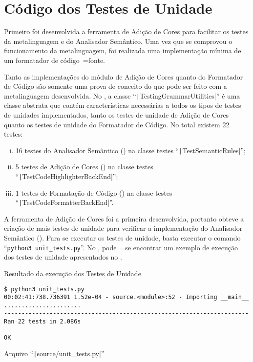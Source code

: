 \chapter[Testes de Unidade]{Código dos Testes de Unidade}

Primeiro foi desenvolvida a ferramenta de Adição de Cores para facilitar os testes da metalinguagem e
do Analisador Semântico.
Uma vez que se comprovou o funcionamento da metalinguagem,
foi realizada uma implementação mínima de um formatador de código~=fonte.

Tanto as implementações do módulo de Adição de Cores quanto do Formatador de Código são somente uma prova de conceito do que pode ser feito com a metalinguagem desenvolvida.
No ,
a classe ``\texttt|TestingGrammarUtilities|'' é uma classe abstrata \cite{understandingDataAbstraction} que contém características necessárias a todos os tipos de testes de unidades implementados,
tanto os testes de unidade de Adição de Cores quanto os testes de unidade do Formatador de Código.
No total existem 22 testes:
\begin{enumerate}[i)]
\item 16 testes do Analisador Semântico () na classe testes ``\texttt|TestSemanticRules|'';
\item 5 testes de Adição de Cores () na classe testes ``\texttt|TestCodeHighlighterBackEnd|'';
\item 1 testes de Formatação de Código () na classe testes ``\texttt|TestCodeFormatterBackEnd|''.
\end{enumerate}%

A ferramenta de Adição de Cores foi a primeira desenvolvida,
portanto obteve a criação de mais testes de unidade para verificar a implementação do Analisador Semântico ().
Para se executar os testes de unidade,
basta executar o comando ``\texttt{python3 unit_tests.py}''.
No ,
pode~=se encontrar um exemplo de execução dos testes de unidade apresentados no .
\begin{code}
\caption{Resultado da execução dos Testes de Unidade}
\label{code:unitTestsResults}
\begin{verbatim}
$ python3 unit_tests.py
00:02:41:738.736391 1.52e-04 - source.<module>:52 - Importing __main__
......................
----------------------------------------------------------------------
Ran 22 tests in 2.086s

OK
\end{verbatim}
\end{code}
\begin{code}
\caption{Arquivo ``\texttt|source/unit_tests.py|''}
\label{code:unitTestsPy}
\inputminted[firstline=39,firstnumber=1]{python3}{../source/unit_tests.py}
\end{code}


